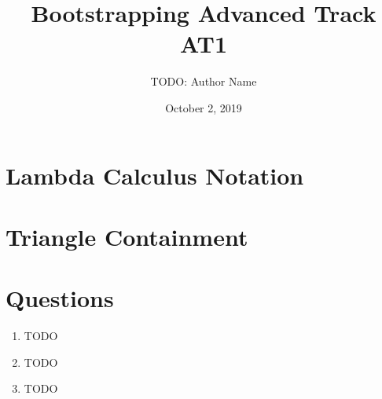 \documentclass[12pt]{article}
\begin{document}
\title{Bootstrapping Advanced Track AT1}
\author{TODO: Author Name}
\date{October 2, 2019}

\maketitle






\section{Lambda Calculus Notation}




\section{Triangle Containment}




\section*{Questions}


\begin{enumerate}
  \item TODO

  \item TODO

  \item TODO


\end{enumerate}
\end{document}
